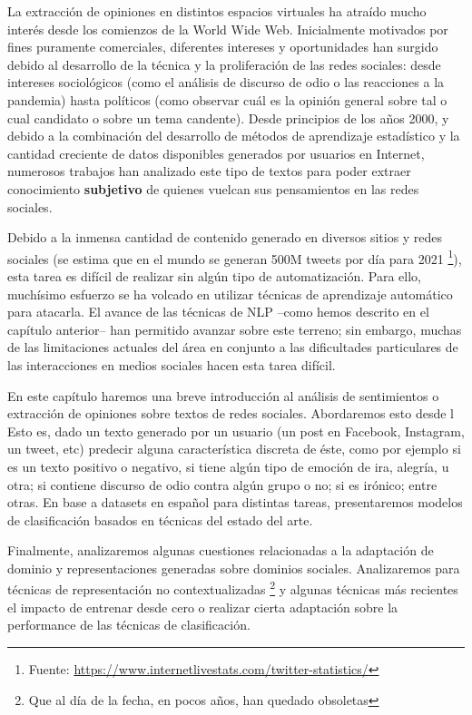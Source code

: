 \label{chap:03_social_text_classification}

La extracción de opiniones en distintos espacios virtuales ha atraído mucho interés desde los comienzos de la World Wide Web. Inicialmente motivados por fines puramente comerciales, diferentes intereses y oportunidades han surgido debido al desarrollo de la técnica y la proliferación de las redes sociales: desde intereses sociológicos (como el análisis de discurso de odio o las reacciones a la pandemia) hasta políticos (como observar cuál es la opinión general sobre tal o cual candidato o sobre un tema candente). Desde principios de los años 2000, y debido a la combinación del desarrollo de métodos de aprendizaje estadístico y la cantidad creciente de datos disponibles generados por usuarios en Internet, numerosos trabajos han analizado este tipo de textos para poder extraer conocimiento \textbf{subjetivo} de quienes vuelcan sus pensamientos en las redes sociales.

Debido a la inmensa cantidad de contenido generado en diversos sitios y redes sociales (se estima que en el mundo se generan 500M tweets por día para 2021 \footnote{Fuente: \url{https://www.internetlivestats.com/twitter-statistics/}}), esta tarea es difícil de realizar sin algún tipo de automatización. Para ello, muchísimo esfuerzo se ha volcado en utilizar técnicas de aprendizaje automático para atacarla. El avance de las técnicas de NLP --como hemos descrito en el capítulo anterior-- han permitido avanzar sobre este terreno; sin embargo, muchas de las limitaciones actuales del área  en conjunto a las dificultades particulares de las interacciones en medios sociales hacen esta tarea difícil.

En este capítulo haremos una breve introducción al análisis de sentimientos o extracción de opiniones sobre textos de redes sociales. Abordaremos esto desde l Esto es, dado un texto generado por un usuario (un post en Facebook, Instagram, un tweet, etc) predecir alguna característica discreta de éste, como por ejemplo si es un texto positivo o negativo, si tiene algún tipo de emoción de ira, alegría, u otra; si contiene discurso de odio contra algún grupo o no; si es irónico; entre otras. En base a datasets en español para distintas tareas, presentaremos modelos de clasificación basados en técnicas del estado del arte.

Finalmente, analizaremos algunas cuestiones relacionadas a la adaptación de dominio y representaciones generadas sobre dominios sociales. Analizaremos para técnicas de representación no contextualizadas \footnote{Que al día de la fecha, en pocos años, han quedado obsoletas} y algunas técnicas más recientes el impacto de entrenar desde cero o realizar cierta adaptación sobre la performance de las técnicas de clasificación.


